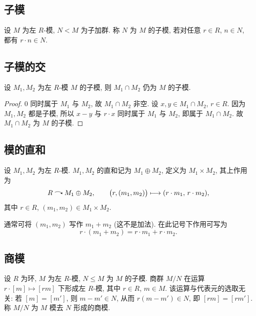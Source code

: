 \subsection{子模}

\begin{definition}[子模]\label{def:submodule}
设 $M$ 为左 $R$-模, $N<M$ 为子加群. 称 $N$ 为 $M$ 的子模, 若对任意 $r\in R$, $n\in N$,
都有 $r\cdot n\in N$.
\end{definition}

\subsection{子模的交}

\begin{proposition}\label{prop:submodule-intersection}
设 $M_1,M_2$ 为左 $R$-模 $M$ 的子模, 则 $M_1\cap M_2$ 仍为 $M$ 的子模.
\end{proposition}

\begin{proof}
$0$ 同时属于 $M_1$ 与 $M_2$, 故 $M_1\cap M_2$ 非空. 设 $x,y\in M_1\cap M_2$, $r\in R$.
因为 $M_1,M_2$ 都是子模, 所以 $x-y$ 与 $r\cdot x$ 同时属于 $M_1$ 与 $M_2$,
即属于 $M_1\cap M_2$. 故 $M_1\cap M_2$ 为 $M$ 的子模.
\end{proof}

\subsection{模的直和}

\begin{definition}[直和]\label{def:module-direct-sum}
设 $M_1,M_2$ 为左 $R$-模. $M_1,M_2$ 的直和记为 $M_1\oplus M_2$, 定义为 $M_1\times M_2$,
其上作用为
\[
  R\acts M_1\oplus M_2,\qquad \bigl(r,(m_1,m_2)\bigr)\longmapsto (r\cdot m_1,\,r\cdot m_2),
\]
其中 $r\in R$, $(m_1,m_2)\in M_1\times M_2$.
\end{definition}

通常可将 $(m_1,m_2)$ 写作 $m_1+m_2$ (这不是加法). 在此记号下作用可写为
\[
  r\cdot(m_1+m_2)=r\cdot m_1+r\cdot m_2 .
\]

\subsection{商模}

\begin{definition}[商模]\label{def:quotient-module}
设 $R$ 为环, $M$ 为左 $R$-模, $N\leq M$ 为 $M$ 的子模.
商群 $M/N$ 在运算 $r\cdot[m]\mapsto[rm]$ 下形成左 $R$-模, 其中 $r\in R$, $m\in M$.
该运算与代表元的选取无关: 若 $[m]=[m']$, 则 $m-m'\in N$, 从而 $r(m-m')\in N$, 即 $[rm]=[rm']$.
称 $M/N$ 为 $M$ 模去 $N$ 形成的商模.
\end{definition}

